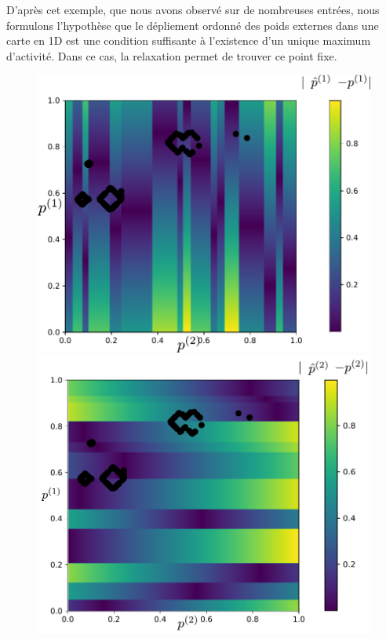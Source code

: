 \documentclass[../main]{subfiles}
\begin{document}
D'après cet exemple, que nous avons observé sur de nombreuses entrées, nous formulons l'hypothèse que le dépliement ordonné des poids externes dans une carte en 1D est une condition suffisante à l'existence d'un unique maximum d'activité. 
Dans ce cas, la relaxation permet de trouver ce point fixe.

\begin{figure}
\begin{minipage}{0.5\textwidth}
\centering
\includegraphics[width=\textwidth]{champ_X_006_t1_notraj.pdf}
\end{minipage}
\begin{minipage}{0.5\textwidth}
\centering
\includegraphics[width=\textwidth]{champ_Y_006_t1_notraj.pdf}

\end{minipage}
\end{figure}
\end{document}
